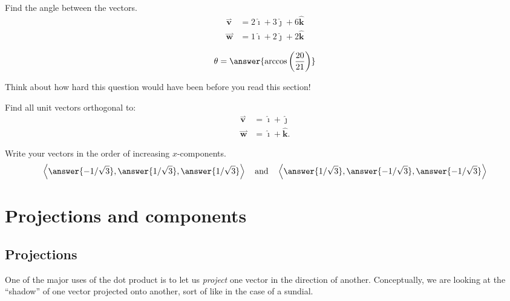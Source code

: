 \documentclass{ximera}
\begin{document}
\begin{question}
  Find the angle between the vectors.
  \begin{align*}
  \overset{\boldsymbol{\rightharpoonup}}{\mathbf{v}} &= 2\boldsymbol{\hat{\imath}}+3\boldsymbol{\hat{\jmath}}+6\boldsymbol{\hat{k}}\\
  \overset{\boldsymbol{\rightharpoonup}}{\mathbf{w}} &= 1\boldsymbol{\hat{\imath}}+2\boldsymbol{\hat{\jmath}}+2\boldsymbol{\hat{k}}
  \end{align*}
  \begin{prompt}
  \[
  \theta = \answer{ \arccos\left(\frac{20}{21}\right)}
  \]
  \end{prompt}
  \begin{feedback}
    Think about how hard this question would have been before you read this section!
  \end{feedback}
\end{question}


\begin{question}
  Find all unit vectors orthogonal to:
  \begin{align*}
    \overset{\boldsymbol{\rightharpoonup}}{\mathbf{v}} &= \boldsymbol{\hat{\imath}} + \boldsymbol{\hat{\jmath}}\\
    \overset{\boldsymbol{\rightharpoonup}}{\mathbf{w}} &= \boldsymbol{\hat{\imath}} + \boldsymbol{\hat{k}} .
  \end{align*}
  \begin{prompt}
    Write your vectors in the order of increasing $x$-components.
    \[
    \left\langle\answer{-1/\sqrt{3}},\answer{1/\sqrt{3}},\answer{1/\sqrt{3}} \right\rangle\quad\text{and}\quad \left\langle\answer{1/\sqrt{3}},\answer{-1/\sqrt{3}},\answer{-1/\sqrt{3}} \right\rangle
    \]
  \end{prompt}
\end{question}



\section{Projections and components}

\subsection{Projections}
One of the major uses of the dot product is to let us \textit{project}
one vector in the direction of another. Conceptually, we are looking
at the ``shadow'' of one vector projected onto another, sort of like
in the case of a sundial.
\end{document}
